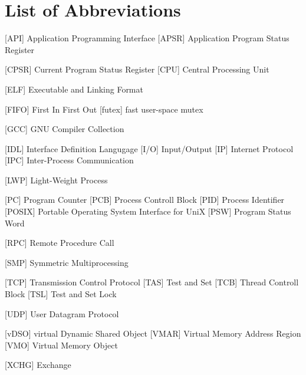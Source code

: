 
\chapter*{List of Abbreviations}

\begin{acronym} [POSIX]
 [API] {Application Programming Interface}
 [APSR] {Application Program Status Register}

 [CPSR] {Current Program Status Register}
 [CPU] {Central Processing Unit}


 [ELF] {Executable and Linking Format}

 [FIFO] {First In First Out}
 [futex] {fast user-space mutex}

 [GCC] {GNU Compiler Collection}


 [IDL] {Interface Definition Langugage}
 [I/O] {Input/Output}
 [IP] {Internet Protocol}
[IPC] {Inter-Process Communication}



 [LWP] {Light-Weight Process}




 [PC] {Program Counter}
 [PCB] {Process Controll Block}
 [PID] {Process Identifier}
 [POSIX] {Portable Operating System Interface for UniX}
 [PSW] {Program Status Word}


 [RPC] {Remote Procedure Call}

 [SMP] {Symmetric Multiprocessing}

 [TCP] {Transmission Control Protocol}
 [TAS] {Test and Set}
 [TCB] {Thread Controll Block}
 [TSL] {Test and Set Lock}

 [UDP] {User Datagram Protocol} 

 [vDSO] {virtual Dynamic Shared Object}
 [VMAR] {Virtual Memory Address Region}
  [VMO]  {Virtual Memory Object}


 [XCHG] {Exchange}



\end{acronym} 
